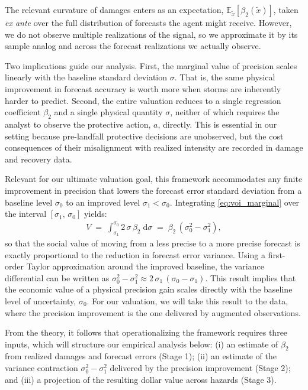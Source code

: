 \documentclass[12pt]{article}%
\begin{document}
The relevant curvature of damages enters as an expectation, $\mathbb{E}_{\tilde{x}}[\beta_{2}(\tilde{x})]$, taken \emph{ex ante} over the full distribution of forecasts the agent might receive. However, we do not observe multiple realizations of the signal, so  we approximate it by its sample analog and across the forecast realizations we actually observe.

Two implications guide our analysis. First, the marginal value of precision scales linearly with the baseline standard deviation $\sigma$. That is, the same physical improvement in forecast accuracy is worth more when storms are inherently harder to predict. Second, the entire valuation reduces to a single regression coefficient $\beta_{2}$ and a single physical quantity $\sigma$, neither of which requires the analyst to observe the protective action, $a$, directly. This is essential in our setting because pre-landfall protective decisions are unobserved, but the cost consequences of their misalignment with realized intensity are recorded in damage and recovery data.

Relevant for our ultimate valuation goal, this framework accommodates any finite improvement in precision that lowers the forecast error standard deviation from a baseline level $\sigma_{0}$ to an improved level $\sigma_{1}<\sigma_{0}$. Integrating \eqref{eq:voi_marginal} over the interval $[\sigma_{1},\,\sigma_{0}]$ yields:
\begin{align}\label{eq:voi_finite}
    V \;=\; \int_{\sigma_{1}}^{\sigma_{0}}
    2\,\sigma\,\beta_{2}\;\mathrm{d}\sigma \;=\;
    \beta_{2}\,\left(\sigma_{0}^{2}-\sigma_{1}^{2}\right),
\end{align}
so that the social value of moving from a less precise to a more precise forecast is exactly proportional to the reduction in forecast error variance. Using a first-order Taylor approximation around the improved baseline, the variance differential can be written as $\sigma_{0}^{2} - \sigma_{1}^{2} \approx 2\,\sigma_{1}\,(\sigma_{0} - \sigma_{1})$. This result implies that the economic value of a physical precision gain scales directly with the baseline level of uncertainty, $\sigma_{0}$. For our valuation, we will take this result to the data, where the precision improvement is the one delivered by augmented observations.

From the theory, it follows that operationalizing the framework requires three inputs, which will structure our empirical analysis below: (i) an estimate of $\beta_{2}$ from realized damages and forecast errors (Stage 1); (ii) an estimate of the variance contraction $\sigma_{0}^{2}-\sigma_{1}^{2}$ delivered by the precision improvement (Stage 2); and (iii) a projection of the resulting dollar value across hazards (Stage 3).
\end{document}
